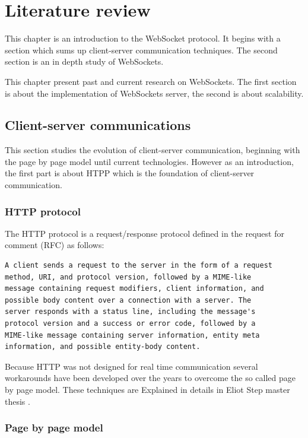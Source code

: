 \chapter{Literature review} 
\label{Chapter1} 

This chapter is an introduction to the WebSocket protocol.  It begins with a
section which sums up client-server communication techniques.  The second
section is an in depth study of WebSockets.

This chapter present past and current research on WebSockets. The first
section is about the implementation of WebSockets server, the second is about
scalability. 

\section{Client-server communications}

This section studies the evolution of client-server communication, beginning
with the page by page model until current technologies. However as an
introduction, the first part is about HTPP which is the foundation of
client-server communication.

\subsection{HTTP protocol}

The HTTP protocol is a request/response protocol defined in the request for
comment (RFC) \cite{Reference1} as follows:

\begin{verbatim} 
A client sends a request to the server in the form of a request 
method, URI, and protocol version, followed by a MIME-like 
message containing request modifiers, client information, and 
possible body content over a connection with a server. The 
server responds with a status line, including the message's
protocol version and a success or error code, followed by a 
MIME-like message containing server information, entity meta 
information, and possible entity-body content.  
\end{verbatim}

Because HTTP was not designed for real time communication several workarounds
have been developed over the years to overcome the so called page by page
model. These techniques are Explained in details in Eliot Step master thesis
\citep{Reference2}.

\subsection{Page by page model}

